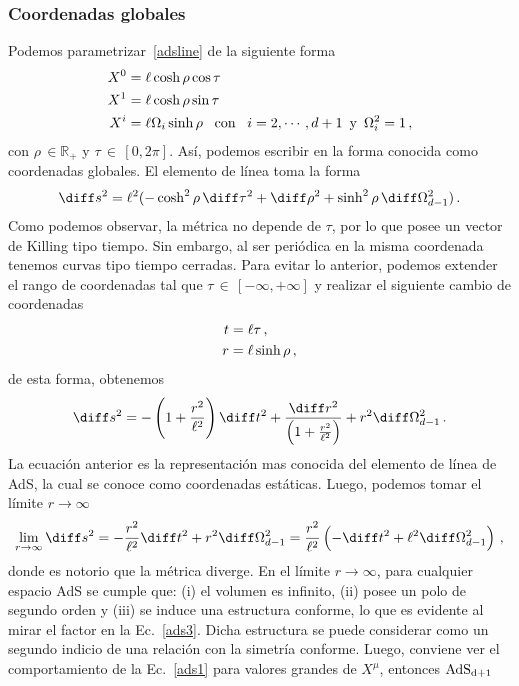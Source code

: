 \documentclass[../Main.tex]{subfiles}
\begin{document}
\subsubsection{Coordenadas globales}
Podemos parametrizar~\eqref{adsline} de la siguiente forma
\begin{align} \notag
    X^{0}&=\ell\cosh{\rho}\cos{\tau}\\ \notag
    X^{1}&=\ell\cosh{\rho}\sin{\tau}\\ \notag
    X^{i}&=\ell\Omega_{i}\sinh{\rho} \,\,\,\,\,\mbox{con}\,\,\,\,\,i=2,\cdots,d+1\,\,\,\mbox{y}\,\,\, \Omega^{2}_{i}=1 \, ,
\end{align}
con $\rho\,\in\mathbb{R}_{+}$ y $\tau\,\in\,[0,2\pi]$. Así, podemos escribir en la forma conocida como coordenadas globales. El elemento de línea toma la forma 
\begin{align}
    \diff s^2=\ell^2(-\cosh^2{\rho}\,\diff\tau^2+\diff\rho^2+\sinh^2{\rho}\,\diff\Omega^2_{d-1})\, . \label{adsglobal}
\end{align}
Como podemos observar, la métrica no depende de $\tau$, por lo que posee un vector de Killing tipo tiempo. Sin embargo, al ser periódica en la misma coordenada tenemos curvas tipo tiempo cerradas. Para evitar lo anterior, podemos extender el rango de coordenadas tal que $\tau\,\in\,[-\infty,+\infty]$ y realizar el siguiente cambio de coordenadas
\begin{align}\notag
t&=\ell\tau \, , \\ \notag 
r&=\ell\sinh{\rho}\, ,
\end{align}
de esta forma, obtenemos
\begin{align}
\diff s^{2}=-\left(1+\frac{r^2}{\ell^2}\right)\diff t^{2}+\frac{\diff r^{2}}{\left(1+\frac{r^2}{\ell^2}\right)}+r^2 \diff\Omega^{2}_{d-1} \, . \label{ads4}
\end{align}
La ecuación anterior es la representación mas conocida del elemento de línea de AdS, la cual se conoce como coordenadas estáticas. Luego, podemos tomar el límite $r\to\infty$
\begin{align}
    \lim_{r\to\infty} \diff s^{2}=-\frac{r^{2}}{\ell^{2}}\diff t^{2}+r^2 \diff\Omega^{2}_{d-1}=\frac{r^2}{\ell^{2}}\left(-\diff t^{2}+\ell^2\diff\Omega^{2}_{d-1}\right)\, , \label{ads3}
\end{align}
donde es notorio que la métrica diverge. En el límite $r\to\infty$, para cualquier espacio AdS se cumple que: (i) el volumen es infinito, (ii) posee un polo de segundo orden y (iii) se induce una estructura conforme, lo que es evidente al mirar el factor en la Ec.~\eqref{ads3}. Dicha estructura se puede considerar como un segundo indicio de una relación con la simetría conforme. Luego, conviene ver el comportamiento de la Ec.~\eqref{ads1} para valores grandes de $X^{\mu}$, entonces $\rm AdS_{d+1}$ 
\end{document}
